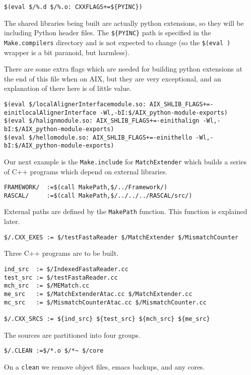 \documentclass{article}
\begin{document}
\begin{verbatim}
$(eval $/%.d $/%.o: CXXFLAGS+=${PYINC})
\end{verbatim}
The shared libraries being built are actually python extensions, so they
will be including Python header files.  The \verb+${PYINC}+ path is
specified in the \verb+Make.compilers+ directory and is not expected to
change (so the \verb+$(eval )+ wrapper is a bit paranoid, but harmless).

There are some extra flags which are needed for building python
extensions at the end of this file when on AIX, but they are very
exceptional, and an explanation of there here is of little value.
\begin{verbatim}
$(eval $/localAlignerInterfacemodule.so: AIX_SHLIB_FLAGS+=-einitlocalAlignerInterface -Wl,-bI:$/AIX_python-module-exports)
$(eval $/halignmodule.so: AIX_SHLIB_FLAGS+=-einithalign -Wl,-bI:$/AIX_python-module-exports)
$(eval $/hellomodule.so: AIX_SHLIB_FLAGS+=-einithello -Wl,-bI:$/AIX_python-module-exports)
\end{verbatim}

Our next example is the \verb+Make.include+ for
\verb+MatchExtender+ which builds a series of C++ programs which
depend on external libraries.

\begin{verbatim}
FRAMEWORK/  :=$(call MakePath,$/../Framework/)
RASCAL/     :=$(call MakePath,$/../../../RASCAL/src/)
\end{verbatim}
External paths are defined by the \verb+MakePath+ function.  This
function is explained later.

\begin{verbatim}
$/.CXX_EXES := $/testFastaReader $/MatchExtender $/MismatchCounter
\end{verbatim}
Three C++ programs are to be built.

\begin{verbatim}
ind_src  := $/IndexedFastaReader.cc
test_src := $/testFastaReader.cc
mch_src  := $/MEMatch.cc
me_src   := $/MatchExtenderAtac.cc $/MatchExtender.cc
mc_src   := $/MismatchCounterAtac.cc $/MismatchCounter.cc

$/.CXX_SRCS := ${ind_src} ${test_src} ${mch_src} ${me_src}
\end{verbatim}
The sources are partitioned into four groups.

\begin{verbatim}
$/.CLEAN :=$/*.o $/*~ $/core
\end{verbatim}
On a \verb+clean+ we remove object files, emacs backups, and any cores.
\end{document}
